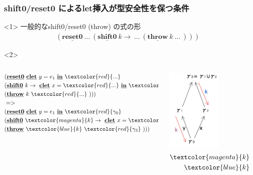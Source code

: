 \documentclass[dvipdfmx,cjk,xcolor=dvipsnames,envcountsect,notheorems,12pt]{beamer}
\newcommand\cResetz{\underline{\textbf{reset0}}}
\newcommand\cShiftz{\underline{\textbf{shift0}}}
\newcommand\cThrow{\underline{\textbf{throw}}}
\newcommand\cLet{\underline{\textbf{clet}}}
\newcommand\cIn{\underline{\textbf{in}}}
\newcommand\codeT[2]{\langle{#1}\rangle^{#2}}
\newcommand\contT[2]{({#1} \Rightarrow {#2})}
\newcommand\red[1]{\textcolor{red}{#1}}
\newcommand\magenta[1]{\textcolor{magenta}{#1}}
\newcommand\blue[1]{\textcolor{blue}{#1}}
\theoremstyle{definition}
\begin{document}
\begin{frame}
  \frametitle{shift0/reset0 によるlet挿入が型安全性を保つ条件}
  \begin{onlyenv}<1>
    一般的なshift0/reset0 (throw) の式の形
    \begin{align*}
      (\cResetz ~...~ (\cShiftz ~k \to ~...~ (\cThrow ~k ~...~)))
    \end{align*}
  \end{onlyenv}


  \begin{onlyenv}<2>
    \begin{columns}
      \begin{column}{0.5\textwidth}%
        \begin{align*}
          &(\cResetz ~\cLet~ y = e_1 ~\cIn~ \red{...} \\
          &(\cShiftz ~k \to ~\cLet~ x = \red{...} ~\cIn~ \red{...}\\
          &(\cThrow ~k ~\red{...}~)))\\
          &=> \\
          &(\cResetz ~\cLet~ y = e_1 ~\cIn~ \red{\gamma_0} \\
          &(\cShiftz ~\magenta{k} \to ~\cLet~ x = \red{\gamma_1} ~\cIn~ \red{\gamma_2} \\
          &(\cThrow ~\blue{k} ~\red{\gamma_3}~)))
        \end{align*}
      \end{column}

      \begin{column}{0.5\textwidth}%
        \center
        \includegraphics[clip,height=4cm]{./img/index.png}
        \begin{align*}
          \magenta{k} ~:~ \contT{\codeT{\cdot}{\gamma_1}}{\codeT{\cdot}{\gamma_0}}\\
          \blue{k} ~:~  \contT{\codeT{\cdot}{\gamma_3}}{\codeT{\cdot}{\gamma_2}}\\
        \end{align*}
      \end{column}
    \end{columns}
  \end{onlyenv}

\end{frame}
\end{document}
